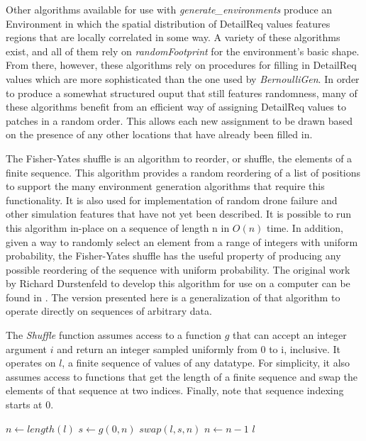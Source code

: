 Other algorithms available for use with \textit{generate\_environments} produce an Environment in which the spatial distribution of DetailReq values features regions that are locally correlated in some way. A variety of these algorithms exist, and all of them rely on \textit{randomFootprint} for the environment's basic shape. From there, however, these algorithms rely on procedures for filling in DetailReq values which are more sophisticated than the one used by \textit{BernoulliGen}. In order to produce a somewhat structured ouput that still features randomness, many of these algorithms benefit from an efficient way of assigning DetailReq values to patches in a random order. This allows each new assignment to be drawn based on the presence of any other locations that have already been filled in.

The Fisher-Yates shuffle is an algorithm to reorder, or shuffle, the elements of a finite sequence. This algorithm provides a random reordering of a list of positions to support the many environment generation algorithms that require this functionality. It is also used for implementation of random drone failure and other simulation features that have not yet been described. It is possible to run this algorithm in-place on a sequence of length n in $O(n)$ time. In addition, given a way to randomly select an element from a range of integers with uniform probability, the Fisher-Yates shuffle has the useful property of producing any possible reordering of the sequence with uniform probability. The original work by Richard Durstenfeld to develop this algorithm for use on a computer can be found in \cite{FYShuffle}. The version presented here is a generalization of that algorithm to operate directly on sequences of arbitrary data.

The \textit{Shuffle} function assumes access to a function $g$ that can accept an integer argument $i$ and return an integer sampled uniformly from 0 to i, inclusive. It operates on $l$, a finite sequence of values of any datatype. For simplicity, it also assumes access to functions that get the length of a finite sequence and swap the elements of that sequence at two indices. Finally, note that sequence indexing starts at 0.

\begin{algorithmic}

  \State $n\gets length(l)$	
      \State $s\gets g(0, n)$
      \State $swap(l, s, n)$
      \State $n\gets n - 1$
  \EndWhile
  \State \Return $l$
\EndFunction

\end{algorithmic}

